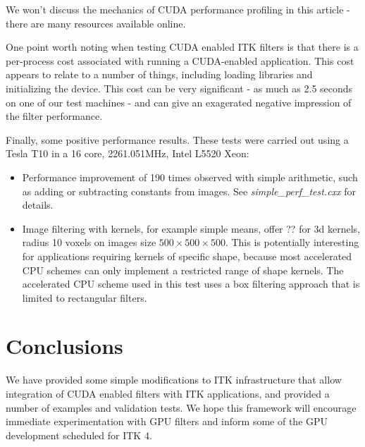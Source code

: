 \documentclass{InsightArticle}
\begin{document}
We won't discuss the mechanics of CUDA performance profiling in this
article - there are many resources available online.

One point worth noting when testing CUDA enabled ITK filters is that
there is a per-process cost associated with running a CUDA-enabled
application. This cost appears to relate to a number of things,
including loading libraries and initializing the device. This cost can
be very significant - as much as 2.5 seconds on one of our test
machines - and can give an exagerated negative impression of the  filter
performance. 

Finally, some positive performance results. These tests were carried
out using a Tesla T10 in a 16 core, 2261.051MHz, Intel L5520  Xeon:
\begin{itemize}
\item Performance improvement of 190 times observed with simple arithmetic, such as adding or subtracting constants from
  images. See {\em simple\_perf\_test.cxx} for details.
\item Image filtering with kernels, for example simple means, offer ??
  for 3d kernels, radius 10 voxels on images size $500 \times 500
  \times 500$. This is potentially interesting for applications
  requiring kernels of specific shape, because most accelerated CPU
  schemes can only implement a restricted range of shape kernels. The
  accelerated CPU scheme used in this test uses a box filtering
  approach that is limited to rectangular filters.
\end{itemize}


\section{Conclusions}
We have provided some simple modifications to ITK infrastructure that
allow integration of CUDA enabled filters with ITK applications, and
provided a number of examples and validation tests. We hope this
framework will encourage immediate experimentation with GPU filters
and inform some of the GPU development scheduled for ITK 4.


%

\nocite{ITKSoftwareGuide}
\end{document}
